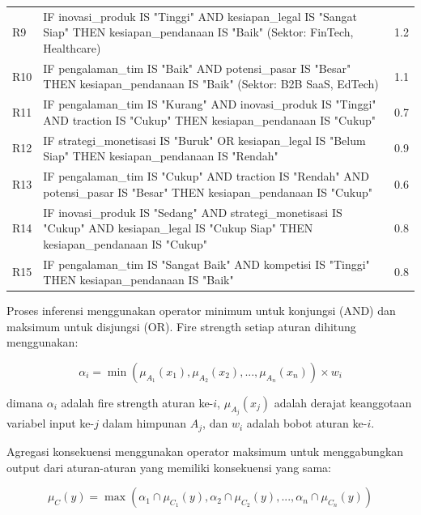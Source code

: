 \documentclass[12pt,a4paper]{article}
\begin{document}
\begin{longtable}{@{}p{1cm}p{12cm}p{2cm}@{}}
R9 & IF inovasi\_produk IS "Tinggi" AND kesiapan\_legal IS "Sangat Siap" THEN kesiapan\_pendanaan IS "Baik" (Sektor: FinTech, Healthcare) & 1.2 \\

R10 & IF pengalaman\_tim IS "Baik" AND potensi\_pasar IS "Besar" THEN kesiapan\_pendanaan IS "Baik" (Sektor: B2B SaaS, EdTech) & 1.1 \\

R11 & IF pengalaman\_tim IS "Kurang" AND inovasi\_produk IS "Tinggi" AND traction IS "Cukup" THEN kesiapan\_pendanaan IS "Cukup" & 0.7 \\

R12 & IF strategi\_monetisasi IS "Buruk" OR kesiapan\_legal IS "Belum Siap" THEN kesiapan\_pendanaan IS "Rendah" & 0.9 \\

R13 & IF pengalaman\_tim IS "Cukup" AND traction IS "Rendah" AND potensi\_pasar IS "Besar" THEN kesiapan\_pendanaan IS "Cukup" & 0.6 \\

R14 & IF inovasi\_produk IS "Sedang" AND strategi\_monetisasi IS "Cukup" AND kesiapan\_legal IS "Cukup Siap" THEN kesiapan\_pendanaan IS "Cukup" & 0.8 \\

R15 & IF pengalaman\_tim IS "Sangat Baik" AND kompetisi IS "Tinggi" THEN kesiapan\_pendanaan IS "Baik" & 0.8 \\

\end{longtable}

Proses inferensi menggunakan operator minimum untuk konjungsi (AND) dan maksimum untuk disjungsi (OR). Fire strength setiap aturan dihitung menggunakan:

\begin{equation}
\alpha_i = \min(\mu_{A_1}(x_1), \mu_{A_2}(x_2), ..., \mu_{A_n}(x_n)) \times w_i
\end{equation}

dimana $\alpha_i$ adalah fire strength aturan ke-$i$, $\mu_{A_j}(x_j)$ adalah derajat keanggotaan variabel input ke-$j$ dalam himpunan $A_j$, dan $w_i$ adalah bobot aturan ke-$i$.

Agregasi konsekuensi menggunakan operator maksimum untuk menggabungkan output dari aturan-aturan yang memiliki konsekuensi yang sama:

\begin{equation}
\mu_C(y) = \max(\alpha_1 \cap \mu_{C_1}(y), \alpha_2 \cap \mu_{C_2}(y), ..., \alpha_n \cap \mu_{C_n}(y))
\end{equation}
\end{document}
